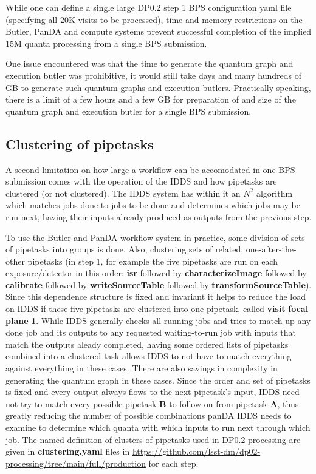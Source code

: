 \documentclass[OPS,authoryear,toc]{lsstdoc}
\begin{document}
While one can define a single large DP0.2 step 1 BPS configuration yaml file
(specifying all 20K visits to be processed), time and memory restrictions
on the Butler, PanDA and compute systems prevent successful completion of 
the implied 15M quanta processing from a single BPS submission.

One issue encountered was that the time to generate the quantum graph 
and execution butler was prohibitive, 
it would still take days and many hundreds of GB to generate such 
quantum graphs and execution butlers.  Practically speaking, 
there is a limit of a few hours and a few GB for preparation of and size of 
the quantum graph and execution butler for a single BPS submission.  

\subsection{Clustering of pipetasks}
A second limitation on how large a workflow can be accomodated in one
BPS submission comes with the operation of the IDDS and how
pipetasks are clustered (or not clustered).  The IDDS system has within 
it an $N^2$ algorithm which matches jobs done to jobs-to-be-done and 
determines which jobs may be run next, having their inputs already produced
as outputs from the previous step.

To use the Butler and PanDA workflow system in practice, some division of
sets of pipetasks into groups is done.  Also, clustering sets of related, 
one-after-the-other pipetasks (in step 1, for example the five pipetasks are 
run on each exposure/detector in this order: {\bf isr} followed by 
{\bf characterizeImage} followed by {\bf calibrate} followed by 
{\bf writeSourceTable} followed by  {\bf transformSourceTable}).  Since this
dependence structure is fixed and invariant it helps to reduce the load 
on IDDS if these five pipetasks are clustered into one pipetask, 
called {\bf visit$\_$focal$\_$plane$\_$1}.  While IDDS generally 
checks all running jobs and tries to match up any done job and its 
outputs to any requested 
waiting-to-run job with inputs that match the outputs aleady completed, 
having some ordered lists of pipetasks combined into a clustered task
allows IDDS to not have to match everything against everything in these
cases.  There are also savings in complexity in generating the
quantum graph in these cases.
Since the order and set of pipetasks is fixed and every output always 
flows to the next pipetask's input, IDDS need not try to match every 
possible pipetask {\bf B} to follow on from pipetask {\bf A}, thus greatly 
reducing the number of possible combinations panDA IDDS needs to 
examine to determine which quanta with which
inputs to run next through which job.  The named definition of clusters 
of pipetasks used in DP0.2 processing are 
given in {\bf clustering.yaml} files in 
\url{https://github.com/lsst-dm/dp02-processing/tree/main/full/production} 
for each step.  
\end{document}
